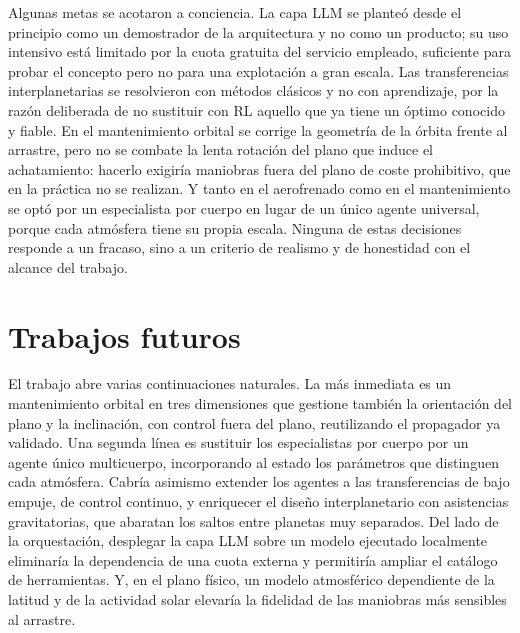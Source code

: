 
Algunas metas se acotaron a conciencia. La capa \gls{LLM} se planteó desde el principio como un demostrador de la arquitectura y no como un producto; su uso intensivo está limitado por la cuota gratuita del servicio empleado, suficiente para probar el concepto pero no para una explotación a gran escala. Las transferencias interplanetarias se resolvieron con métodos clásicos y no con aprendizaje, por la razón deliberada de no sustituir con \gls{RL} aquello que ya tiene un óptimo conocido y fiable. En el mantenimiento orbital se corrige la geometría de la órbita frente al arrastre, pero no se combate la lenta rotación del plano que induce el achatamiento: hacerlo exigiría maniobras fuera del plano de coste prohibitivo, que en la práctica no se realizan. Y tanto en el aerofrenado como en el mantenimiento se optó por un especialista por cuerpo en lugar de un único agente universal, porque cada atmósfera tiene su propia escala. Ninguna de estas decisiones responde a un fracaso, sino a un criterio de realismo y de honestidad con el alcance del trabajo.

\section{Trabajos futuros}

El trabajo abre varias continuaciones naturales. La más inmediata es un mantenimiento orbital en tres dimensiones que gestione también la orientación del plano y la inclinación, con control fuera del plano, reutilizando el propagador ya validado. Una segunda línea es sustituir los especialistas por cuerpo por un agente único multicuerpo, incorporando al estado los parámetros que distinguen cada atmósfera. Cabría asimismo extender los agentes a las transferencias de bajo empuje, de control continuo, y enriquecer el diseño interplanetario con asistencias gravitatorias, que abaratan los saltos entre planetas muy separados. Del lado de la orquestación, desplegar la capa \gls{LLM} sobre un modelo ejecutado localmente eliminaría la dependencia de una cuota externa y permitiría ampliar el catálogo de herramientas. Y, en el
plano físico, un modelo atmosférico dependiente de la latitud y de la actividad solar elevaría la fidelidad de las maniobras más sensibles al arrastre.


